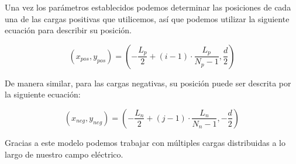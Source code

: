 
\tab Una vez los parámetros establecidos podemos determinar las posiciones de cada una de las cargas positivas que utilicemos, así que podemos utilizar la siguiente ecuación para describir su posición.

\begin{equation}
    (x_{pos}, y_{pos}) = \left(-\frac{L_p}{2} + (i-1) \cdot \frac{L_p}{N_p-1}, \frac{d}{2}\right)
\end{equation}

\tab De manera similar, para las cargas negativas, su posición puede ser descrita por la siguiente ecuación:

\begin{equation}
    (x_{neg}, y_{neg}) = \left(-\frac{L_n}{2} + (j-1) \cdot \frac{L_n}{N_n-1}, -\frac{d}{2}\right)
\end{equation}

\tab Gracias a este modelo podemos trabajar con múltiples cargas distribuidas a lo largo de nuestro campo eléctrico.